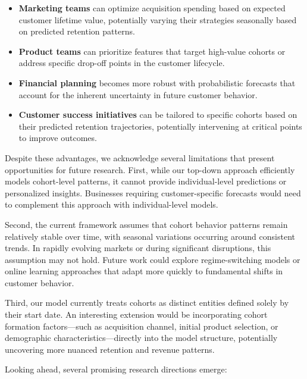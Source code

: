 \documentclass[11pt]{amsart}
\theoremstyle{definition}
\begin{document}
\begin{itemize}
    \item \textbf{Marketing teams} can optimize acquisition spending based on expected customer lifetime value, potentially
          varying their strategies seasonally based on predicted retention patterns.

    \item \textbf{Product teams} can prioritize features that target high-value cohorts or address specific drop-off points
          in the customer lifecycle.

    \item \textbf{Financial planning} becomes more robust with probabilistic forecasts that account for the inherent
          uncertainty in future customer behavior.

    \item \textbf{Customer success initiatives} can be tailored to specific cohorts based on their predicted retention
          trajectories, potentially intervening at critical points to improve outcomes.
\end{itemize}

Despite these advantages, we acknowledge several limitations that present opportunities for future research. First, while our
top-down approach efficiently models cohort-level patterns, it cannot provide individual-level predictions or personalized
insights. Businesses requiring customer-specific forecasts would need to complement this approach with individual-level
models.

Second, the current framework assumes that cohort behavior patterns remain relatively stable over time, with seasonal
variations occurring around consistent trends. In rapidly evolving markets or during significant disruptions, this assumption
may not hold. Future work could explore regime-switching models or online learning approaches that adapt more quickly to
fundamental shifts in customer behavior.

Third, our model currently treats cohorts as distinct entities defined solely by their start date. An interesting extension
would be incorporating cohort formation factors—such as acquisition channel, initial product selection, or demographic
characteristics—directly into the model structure, potentially uncovering more nuanced retention and revenue patterns.

Looking ahead, several promising research directions emerge:
\end{document}
